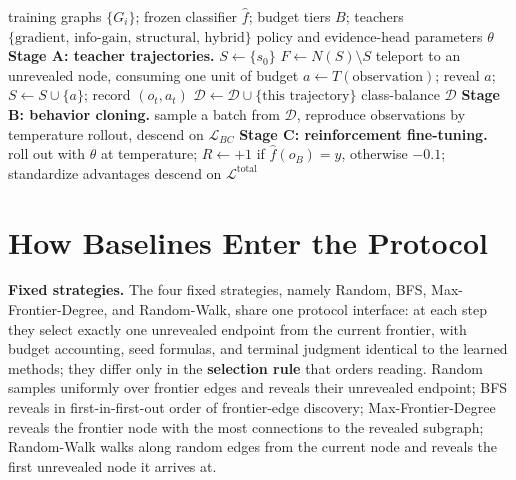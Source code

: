 \documentclass{article}
\begin{document}
\begin{algorithm}[h]
\caption{Three-stage training pipeline}
\label{alg:pipeline}
\begin{algorithmic}[1]
\REQUIRE training graphs $\{G_i\}$; frozen classifier $\hat f$; budget tiers $B$; teachers $\{\text{gradient, info-gain, structural, hybrid}\}$
\ENSURE policy and evidence-head parameters $\theta$
\STATE \textbf{Stage A: teacher trajectories.}
    \STATE $S \leftarrow \{s_0\}$
        \STATE $F \leftarrow N(S)\setminus S$
            \STATE teleport to an unrevealed node, consuming one unit of budget
        \ENDIF
        \STATE $a \leftarrow T(\text{observation})$; reveal $a$; $S \leftarrow S \cup \{a\}$; record $(o_t,a_t)$
    \ENDWHILE
        \STATE $\mathcal{D} \leftarrow \mathcal{D} \cup \{\text{this trajectory}\}$
    \ENDIF
\ENDFOR
\STATE class-balance $\mathcal{D}$
\STATE \textbf{Stage B: behavior cloning.}
\REPEAT
    \STATE sample a batch from $\mathcal{D}$, reproduce observations by temperature rollout, descend on $\mathcal{L}_{BC}$
\STATE \textbf{Stage C: reinforcement fine-tuning.}
\REPEAT
    \STATE roll out with $\theta$ at temperature; $R \leftarrow +1$ if $\hat f(o_B)=y$, otherwise $-0.1$; standardize advantages
    \STATE descend on $\mathcal{L}^{\mathrm{total}}$
\end{algorithmic}
\end{algorithm}

\section{How Baselines Enter the Protocol}
\label{app:baselines}

\textbf{Fixed strategies.} The four fixed strategies, namely Random, BFS, Max-Frontier-Degree, and Random-Walk, share one protocol interface: at each step they select exactly one unrevealed endpoint from the current frontier, with budget accounting, seed formulas, and terminal judgment identical to the learned methods; they differ only in the \textbf{selection rule} that orders reading. Random samples uniformly over frontier edges and reveals their unrevealed endpoint; BFS reveals in first-in-first-out order of frontier-edge discovery; Max-Frontier-Degree reveals the frontier node with the most connections to the revealed subgraph; Random-Walk walks along random edges from the current node and reveals the first unrevealed node it arrives at.
\end{document}
